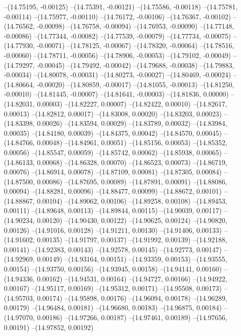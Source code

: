 --(14.75195, -0.00125)
--(14.75391, -0.00121)
--(14.75586, -0.00118)
--(14.75781, -0.00114)
--(14.75977, -0.00110)
--(14.76172, -0.00106)
--(14.76367, -0.00102)
--(14.76562, -0.00098)
--(14.76758, -0.00094)
--(14.76953, -0.00090)
--(14.77148, -0.00086)
--(14.77344, -0.00082)
--(14.77539, -0.00079)
--(14.77734, -0.00075)
--(14.77930, -0.00071)
--(14.78125, -0.00067)
--(14.78320, -0.00064)
--(14.78516, -0.00060)
--(14.78711, -0.00056)
--(14.78906, -0.00053)
--(14.79102, -0.00049)
--(14.79297, -0.00045)
--(14.79492, -0.00042)
--(14.79688, -0.00038)
--(14.79883, -0.00034)
--(14.80078, -0.00031)
--(14.80273, -0.00027)
--(14.80469, -0.00024)
--(14.80664, -0.00020)
--(14.80859, -0.00017)
--(14.81055, -0.00013)
--(14.81250, -0.00010)
--(14.81445, -0.00007)
--(14.81641, -0.00003)
--(14.81836, 0.00000)
--(14.82031, 0.00003)
--(14.82227, 0.00007)
--(14.82422, 0.00010)
--(14.82617, 0.00013)
--(14.82812, 0.00017)
--(14.83008, 0.00020)
--(14.83203, 0.00023)
--(14.83398, 0.00026)
--(14.83594, 0.00029)
--(14.83789, 0.00032)
--(14.83984, 0.00035)
--(14.84180, 0.00039)
--(14.84375, 0.00042)
--(14.84570, 0.00045)
--(14.84766, 0.00048)
--(14.84961, 0.00051)
--(14.85156, 0.00053)
--(14.85352, 0.00056)
--(14.85547, 0.00059)
--(14.85742, 0.00062)
--(14.85938, 0.00065)
--(14.86133, 0.00068)
--(14.86328, 0.00070)
--(14.86523, 0.00073)
--(14.86719, 0.00076)
--(14.86914, 0.00078)
--(14.87109, 0.00081)
--(14.87305, 0.00084)
--(14.87500, 0.00086)
--(14.87695, 0.00089)
--(14.87891, 0.00091)
--(14.88086, 0.00094)
--(14.88281, 0.00096)
--(14.88477, 0.00099)
--(14.88672, 0.00101)
--(14.88867, 0.00104)
--(14.89062, 0.00106)
--(14.89258, 0.00108)
--(14.89453, 0.00111)
--(14.89648, 0.00113)
--(14.89844, 0.00115)
--(14.90039, 0.00117)
--(14.90234, 0.00120)
--(14.90430, 0.00122)
--(14.90625, 0.00124)
--(14.90820, 0.00126)
--(14.91016, 0.00128)
--(14.91211, 0.00130)
--(14.91406, 0.00133)
--(14.91602, 0.00135)
--(14.91797, 0.00137)
--(14.91992, 0.00139)
--(14.92188, 0.00141)
--(14.92383, 0.00143)
--(14.92578, 0.00145)
--(14.92773, 0.00147)
--(14.92969, 0.00149)
--(14.93164, 0.00151)
--(14.93359, 0.00153)
--(14.93555, 0.00154)
--(14.93750, 0.00156)
--(14.93945, 0.00158)
--(14.94141, 0.00160)
--(14.94336, 0.00162)
--(14.94531, 0.00164)
--(14.94727, 0.00166)
--(14.94922, 0.00167)
--(14.95117, 0.00169)
--(14.95312, 0.00171)
--(14.95508, 0.00173)
--(14.95703, 0.00174)
--(14.95898, 0.00176)
--(14.96094, 0.00178)
--(14.96289, 0.00179)
--(14.96484, 0.00181)
--(14.96680, 0.00183)
--(14.96875, 0.00184)
--(14.97070, 0.00186)
--(14.97266, 0.00187)
--(14.97461, 0.00189)
--(14.97656, 0.00191)
--(14.97852, 0.00192)
